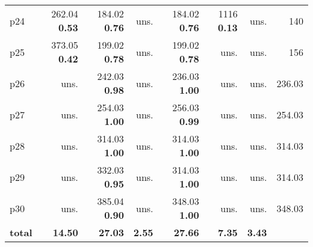 \begin{tabular}{|l|rrrrrr|r|}
p24 & {\footnotesize 262.04} \textbf{0.53} & {\footnotesize 184.02} \textbf{0.76} & uns. & {\footnotesize 184.02} \textbf{0.76} & {\footnotesize 1116} \textbf{0.13} & uns. & 140\\
p25 & {\footnotesize 373.05} \textbf{0.42} & {\footnotesize 199.02} \textbf{0.78} & uns. & {\footnotesize 199.02} \textbf{0.78} & uns. & uns. & 156\\
p26 & uns. & {\footnotesize 242.03} \textbf{0.98} & uns. & {\footnotesize 236.03} \textbf{1.00} & uns. & uns. & 236.03\\
p27 & uns. & {\footnotesize 254.03} \textbf{1.00} & uns. & {\footnotesize 256.03} \textbf{0.99} & uns. & uns. & 254.03\\
p28 & uns. & {\footnotesize 314.03} \textbf{1.00} & uns. & {\footnotesize 314.03} \textbf{1.00} & uns. & uns. & 314.03\\
p29 & uns. & {\footnotesize 332.03} \textbf{0.95} & uns. & {\footnotesize 314.03} \textbf{1.00} & uns. & uns. & 314.03\\
p30 & uns. & {\footnotesize 385.04} \textbf{0.90} & uns. & {\footnotesize 348.03} \textbf{1.00} & uns. & uns. & 348.03\\
\hline
\textbf{total} & \textbf{14.50} & \textbf{27.03} & \textbf{2.55} & \textbf{27.66} & \textbf{7.35} & \textbf{3.43} & \\
\hline
\end{tabular}

